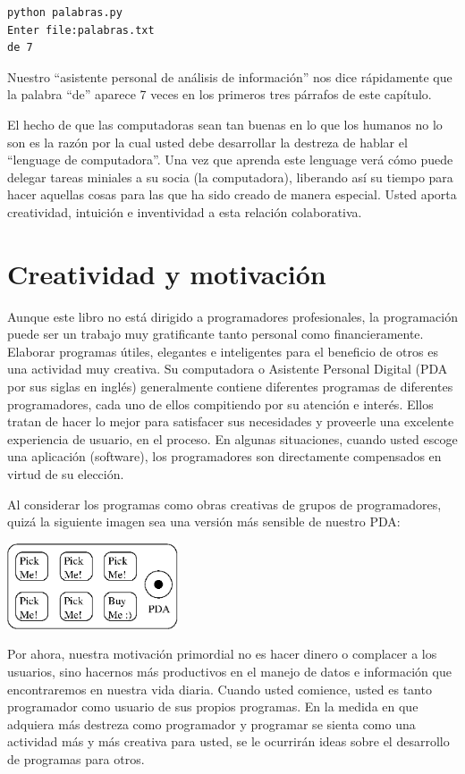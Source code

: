 \beforeverb
\begin{verbatim}
python palabras.py
Enter file:palabras.txt
de 7
\end{verbatim}
\afterverb
%
Nuestro ``asistente personal de an\'alisis de informaci\'on'' nos dice r\'apidamente que la palabra ``de'' aparece 7 veces en los primeros tres p\'arrafos de este cap\'itulo.

El hecho de que las computadoras sean tan buenas en lo que los humanos no lo son es la raz\'on por la cual usted debe desarrollar la destreza de hablar el ``lenguage de computadora''. Una vez que aprenda este lenguage ver\'a c\'omo puede delegar tareas miniales a su socia (la computadora), liberando as\'i su tiempo para hacer aquellas cosas para las que ha sido creado de manera especial. Usted aporta creatividad, intuici\'on e inventividad a esta relaci\'on colaborativa.  

\section{Creatividad y motivaci\'on}

Aunque este libro no est\'a dirigido a programadores profesionales, la programaci\'on puede ser un trabajo muy gratificante tanto personal como financieramente. 
Elaborar programas \'utiles, elegantes e inteligentes para el beneficio de otros es una actividad muy creativa. Su computadora o Asistente Personal Digital (PDA por sus siglas en ingl\'es) 
generalmente contiene diferentes programas de diferentes programadores, cada uno de ellos compitiendo por su atenci\'on e inter\'es. Ellos tratan de hacer lo mejor para satisfacer sus necesidades y proveerle una excelente experiencia de usuario, en el proceso. En algunas situaciones, cuando usted escoge una aplicaci\'on (software), los programadores son directamente compensados en virtud de su elecci\'on.

Al considerar los programas como obras creativas de grupos de programadores, quiz\'a la siguiente imagen sea una versi\'on m\'as sensible de nuestro PDA:

\beforefig
\centerline{\includegraphics[height=1.00in]{figs2/pda2.eps}}
\afterfig

Por ahora, nuestra motivaci\'on primordial no es hacer dinero o complacer a los usuarios, sino hacernos m\'as productivos en el manejo de datos e informaci\'on que encontraremos en nuestra vida diaria.
Cuando usted comience, usted es tanto programador como usuario de sus propios programas. En la medida en que adquiera m\'as destreza como programador y programar se sienta como una actividad m\'as y m\'as creativa para usted, se le ocurrir\'an ideas sobre el desarrollo de programas para otros.

